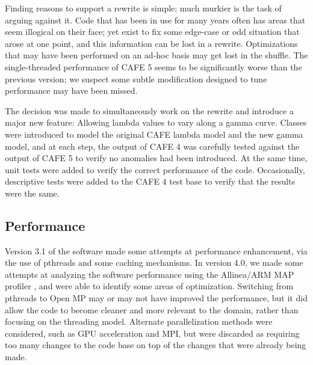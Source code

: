 \documentclass[acmtog, authorversion]{acmart}
\begin{document}
    Finding reasons to support a rewrite is simple; much murkier is the task of arguing against it. Code that has been in use for many years often has areas that seem illogical on their face; yet exist to fix some edge-case or odd situation that arose at one point, and this information can be lost in a rewrite. Optimizations that may have been performed on an ad-hoc basis may get lost in the shuffle. The single-threaded performance of CAFE 5 seems to be significantly worse than the previous version; we suspect some subtle modification designed to tune performance may have been missed.
    
    The decision was made to simultaneously work on the rewrite and introduce a major new feature: Allowing lambda values to vary along a gamma curve. Classes were introduced to model the original CAFE lambda model and the new gamma model, and at each step, the output of CAFE 4 was carefully tested against the output of CAFE 5 to verify no anomalies had been introduced. At the same time, unit tests were added to verify the correct performance of the code. Occasionally, descriptive tests were added to the CAFE 4 test base to verify that the results were the same.
    
        


\subsection{Performance}

    

Version 3.1 of the software made some attempts at performance enhancement, via the use of pthreads and some caching mechanisms. In version 4.0, we made some attempts at analyzing the software performance using the Allinea/ARM MAP profiler , and were able to identify some areas of optimization. Switching from pthreads to Open MP may or may not have improved the performance, but it did allow the code to become cleaner and more relevant to the domain, rather than focusing on the threading model. Alternate parallelization methods were considered, such as GPU acceleration and MPI, but were discarded as requiring too many changes to the code base on top of the changes that were already being made.
\end{document}
